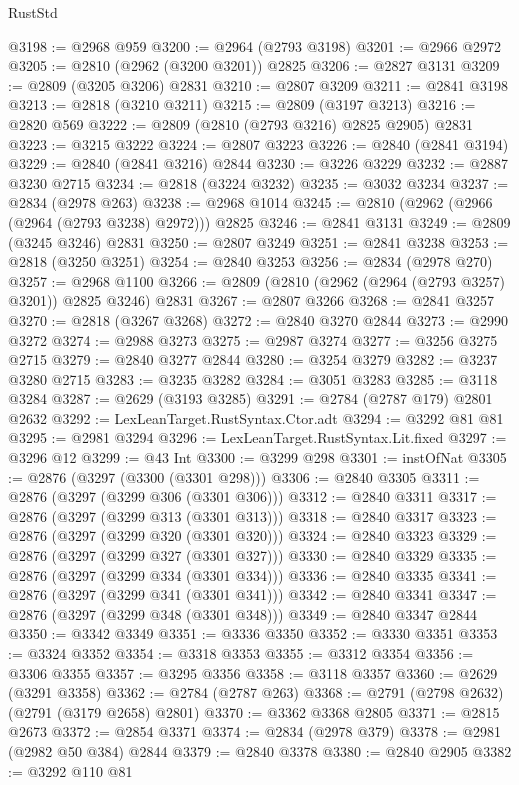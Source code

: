 \begin{lexlean}{RustStd}
\begin{coremodule}
{\begin{coremodule}
{{{{{{{{{{{{{{{{{{{{{{{{{{{{{{{{{@3198 := @2968 @959
@3200 := @2964 (@2793 @3198)
@3201 := @2966 @2972
@3205 := @2810 (@2962 (@3200 @3201)) @2825
@3206 := @2827 @3131
@3209 := @2809 (@3205 @3206) @2831
@3210 := @2807 @3209
@3211 := @2841 @3198
@3213 := @2818 (@3210 @3211)
@3215 := @2809 (@3197 @3213)
@3216 := @2820 @569
@3222 := @2809 (@2810 (@2793 @3216) @2825 @2905) @2831
@3223 := @3215 @3222
@3224 := @2807 @3223
@3226 := @2840 (@2841 @3194)
@3229 := @2840 (@2841 @3216) @2844
@3230 := @3226 @3229
@3232 := @2887 @3230 @2715
@3234 := @2818 (@3224 @3232)
@3235 := @3032 @3234
@3237 := @2834 (@2978 @263)
@3238 := @2968 @1014
@3245 := @2810 (@2962 (@2966 (@2964 (@2793 @3238) @2972))) @2825
@3246 := @2841 @3131
@3249 := @2809 (@3245 @3246) @2831
@3250 := @2807 @3249
@3251 := @2841 @3238
@3253 := @2818 (@3250 @3251)
@3254 := @2840 @3253
@3256 := @2834 (@2978 @270)
@3257 := @2968 @1100
@3266 := @2809 (@2810 (@2962 (@2964 (@2793 @3257) @3201)) @2825 @3246) @2831
@3267 := @2807 @3266
@3268 := @2841 @3257
@3270 := @2818 (@3267 @3268)
@3272 := @2840 @3270 @2844
@3273 := @2990 @3272
@3274 := @2988 @3273
@3275 := @2987 @3274
@3277 := @3256 @3275 @2715
@3279 := @2840 @3277 @2844
@3280 := @3254 @3279
@3282 := @3237 @3280 @2715
@3283 := @3235 @3282
@3284 := @3051 @3283
@3285 := @3118 @3284
@3287 := @2629 (@3193 @3285)
@3291 := @2784 (@2787 @179) @2801 @2632
@3292 := LexLeanTarget.RustSyntax.Ctor.adt
@3294 := @3292 @81 @81
@3295 := @2981 @3294
@3296 := LexLeanTarget.RustSyntax.Lit.fixed
@3297 := @3296 @12
@3299 := @43 Int
@3300 := @3299 @298
@3301 := instOfNat
@3305 := @2876 (@3297 (@3300 (@3301 @298)))
@3306 := @2840 @3305
@3311 := @2876 (@3297 (@3299 @306 (@3301 @306)))
@3312 := @2840 @3311
@3317 := @2876 (@3297 (@3299 @313 (@3301 @313)))
@3318 := @2840 @3317
@3323 := @2876 (@3297 (@3299 @320 (@3301 @320)))
@3324 := @2840 @3323
@3329 := @2876 (@3297 (@3299 @327 (@3301 @327)))
@3330 := @2840 @3329
@3335 := @2876 (@3297 (@3299 @334 (@3301 @334)))
@3336 := @2840 @3335
@3341 := @2876 (@3297 (@3299 @341 (@3301 @341)))
@3342 := @2840 @3341
@3347 := @2876 (@3297 (@3299 @348 (@3301 @348)))
@3349 := @2840 @3347 @2844
@3350 := @3342 @3349
@3351 := @3336 @3350
@3352 := @3330 @3351
@3353 := @3324 @3352
@3354 := @3318 @3353
@3355 := @3312 @3354
@3356 := @3306 @3355
@3357 := @3295 @3356
@3358 := @3118 @3357
@3360 := @2629 (@3291 @3358)
@3362 := @2784 (@2787 @263)
@3368 := @2791 (@2798 @2632) (@2791 (@3179 @2658) @2801)
@3370 := @3362 @3368 @2805
@3371 := @2815 @2673
@3372 := @2854 @3371
@3374 := @2834 (@2978 @379)
@3378 := @2981 (@2982 @50 @384) @2844
@3379 := @2840 @3378
@3380 := @2840 @2905
@3382 := @3292 @110 @81
}}}}}}}}}}}}}}}}}}}}}}}}}}}}}}}}}
\end{coremodule}}
\end{coremodule}
\end{lexlean}

